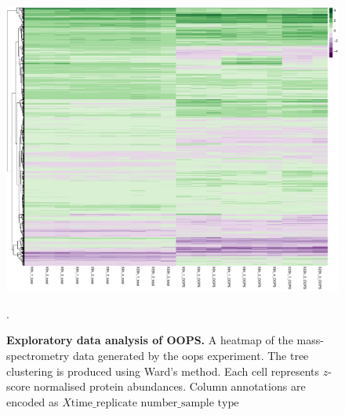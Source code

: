 \documentclass[12pt,english, journal=jpr, layout=twocolumn]{article}
\begin{document}
\begin{figure}[H]
	\centering
	\includegraphics[width =1.1\textwidth]{oopsheatmap.pdf}
	\caption{\textbf{Exploratory data analysis of OOPS.} A heatmap of the mass-spectrometry data generated by the oops experiment. The tree clustering is produced using Ward's method. Each cell represents $z$-score normalised protein abundances. Column annotations are encoded as $X{\text{time}}\_{\text{replicate number}}\_{\text{sample type}}$}.
	\label{figure::figure1}
\end{figure}
\end{document}
